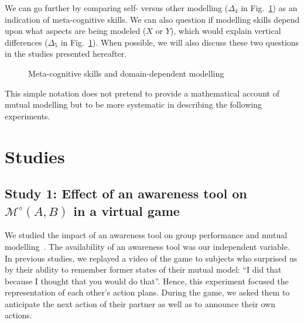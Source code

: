 \documentclass[natbib]{svjour3}
\newcommand{\Model}[3]{{$\mathcal{M}^{\circ}(#1, #2, #3)$}}
\newcommand{\gModel}[2]{{$\mathcal{M}^{\circ}(#1, #2)$}}
\begin{document}
We can go further by comparing self- versus other modelling ($\Delta_4$ in
Fig.~\ref{mm_rectangle}) as an indication of meta-cognitive skills. We can also
question if modelling skills depend upon what aspects are being modeled ($X$ or
$Y$), which would explain vertical differences ($\Delta_5$ in
Fig.~\ref{mm_rectangle}). When possible, we will also discuss these two
questions in the studies presented hereafter.

\begin{figure}[htb]
\centering


\caption{\small Meta-cognitive skills and domain-dependent modelling}

\label{mm_rectangle}
\end{figure}


This simple notation does not pretend to provide a mathematical account of
mutual modelling but to be more systematic in describing the following
experiments. 



\section{Studies}



\subsection{Study 1: Effect of an awareness tool on \gModel{A}{B} in a virtual
game}

We studied the impact of an awareness tool on group performance and mutual
modelling~\citep{nova2007collaboration}. The availability
of an awareness tool was our independent variable. In previous studies, we
replayed a video of the game to subjects who surprised us by their ability to
remember former states of their mutual model: ``I did that because I thought that
you would do that''. Hence, this experiment focused the representation of each
other's action plans. During the game, we asked them to anticipate the next
action of their partner as well as to announce their own actions.
\end{document}
